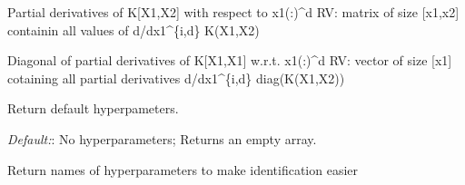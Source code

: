 \documentclass[letterpaper,10pt,english]{sphinxmanual}
\begin{document}
\begin{fulllineitems}
\begin{fulllineitems}
\end{fulllineitems}


\begin{fulllineitems}
\label{covars:pygp.covar.CovarianceFunction.Kgrad_x}
Partial derivatives of K{[}X1,X2{]} with respect to x1(:)\textasciicircum{}d
RV: matrix of size {[}x1,x2{]} containin all values of
d/dx1\textasciicircum{}\{i,d\} K(X1,X2)

\end{fulllineitems}


\begin{fulllineitems}
\label{covars:pygp.covar.CovarianceFunction.Kgrad_xdiag}
Diagonal of partial derivatives of K{[}X1,X1{]} w.r.t. x1(:)\textasciicircum{}d
RV: vector of size {[}x1{]} cotaining all partial derivatives
d/dx1\textasciicircum{}\{i,d\} diag(K(X1,X2))

\end{fulllineitems}


\begin{fulllineitems}
\label{covars:pygp.covar.CovarianceFunction.get_default_hyperparameters}
Return default hyperpameters.

\emph{Default:}: No hyperparameters; Returns an empty array.

\end{fulllineitems}


\begin{fulllineitems}
\label{covars:pygp.covar.CovarianceFunction.get_hyperparameter_names}
Return names of hyperparameters to make
identification easier

\end{fulllineitems}



\end{fulllineitems}
\end{document}
